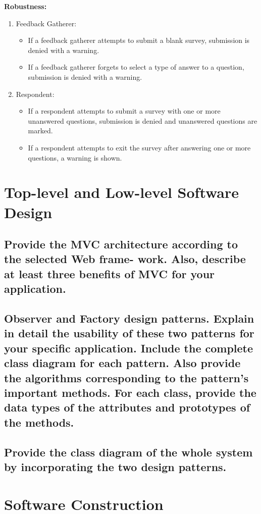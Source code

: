 \documentclass[letterpaper, 12 pt, conference]{ieeeconf}
\begin{document}
\textbf{Robustness:}
\begin{enumerate}
    \item[] Feedback Gatherer:
    \begin{itemize}
        \item  If a feedback gatherer attempts to submit a blank survey, submission is denied with a warning.
        \item If a feedback gatherer forgets to select a type of answer to a question, submission is denied with a warning.
    \end{itemize}
    \item[] Respondent:
    \begin{itemize}
        \item If a respondent attempts to submit a survey with one or more unanswered questions, submission is denied and unanswered questions are marked.
        \item If a respondent attempts to exit the survey after answering one or more questions, a warning is shown.
    \end{itemize}
\end{enumerate}


\section{Top-level and Low-level Software Design}
\subsection{Provide the MVC architecture according to the selected Web frame- work. Also, describe at least three benefits of MVC for your application.}
\subsection{Observer and Factory design patterns. Explain in detail the usability of these two patterns for your specific application. Include the complete class diagram for each pattern. Also provide the algorithms corresponding to the pattern’s important methods. For each class, provide the data types of the attributes and prototypes of the methods.}
\subsection{Provide the class diagram of the whole system by incorporating the two design patterns.}

\section{Software Construction}
\end{document}

